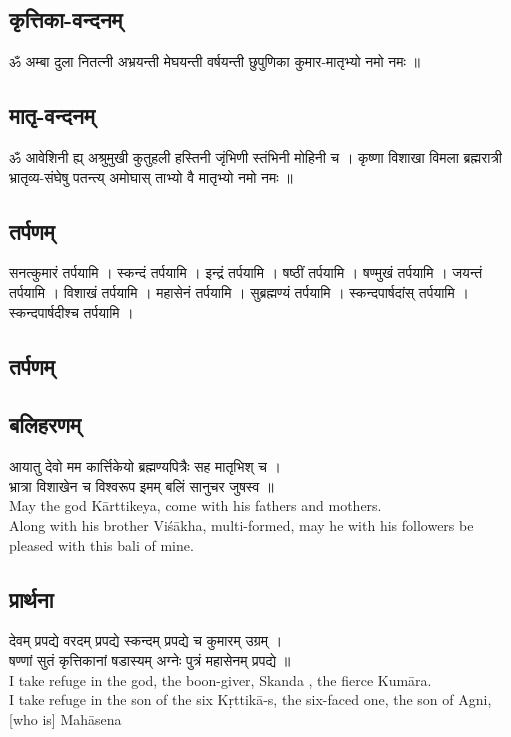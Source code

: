 \documentclass[13pt]{article}
\begin{document}
{\subsection{{\skt कृत्तिका-वन्दनम् }}
{\skt ॐ अम्बा दुला नितत्नी अभ्रयन्ती मेघयन्ती वर्षयन्ती छुपुणिका कुमार-मातृभ्यो नमो नमः ॥
}
\subsection{{\skt मातृ-वन्दनम् }}
{\skt ॐ आवेशिनी ह्य् अश्रुमुखी कुतुहली हस्तिनी जृंभिणी स्तंभिनी मोहिनी च । कृष्णा विशाखा विमला ब्रह्मरात्री भ्रातृव्य-संघेषु पतन्त्य् अमोघास् ताभ्यो वै मातृभ्यो नमो नमः ॥ 
}
\subsection{{\skt तर्पणम् }}
{\skt सनत्कुमारं तर्पयामि । स्कन्दं तर्पयामि । इन्द्रं तर्पयामि । षष्ठीं तर्पयामि । षण्मुखं तर्पयामि । जयन्तं तर्पयामि । विशाखं तर्पयामि । महासेनं तर्पयामि । सुब्रह्मण्यं तर्पयामि । स्कन्दपार्षदांस् तर्पयामि । स्कन्दपार्षदीश्च तर्पयामि ।
 }
\subsection{{\skt तर्पणम् }}
\subsection{{\skt बलिहरणम् }}
{\skt आयातु देवो मम कार्त्तिकेयो ब्रह्मण्यपित्रैः सह मातृभिश् च ।\\
भ्रात्रा विशाखेन च विश्वरूप इमम् बलिं सानुचर जुषस्व ॥ 
}\\[8pt]
May the god Kārttikeya, come with his fathers and mothers.\\
Along with his brother Viśākha, multi-formed, may he with his followers be pleased with this bali of mine.
\subsection{{\skt प्रार्थना }}
{\skt  देवम् प्रपद्ये वरदम् प्रपद्ये स्कन्दम् प्रपद्ये च कुमारम् उग्रम् ।\\
षण्णां सुतं कृत्तिकानां षडास्यम् अग्नेः पुत्रं महासेनम् प्रपद्ये ॥
}\\[8pt]
I take refuge in the god, the boon-giver, Skanda , the fierce Kumāra.\\
I take refuge in the son of the six Kṛttikā-s, the six-faced one, the son of Agni, [who is] Mahāsena
}
\end{document}
